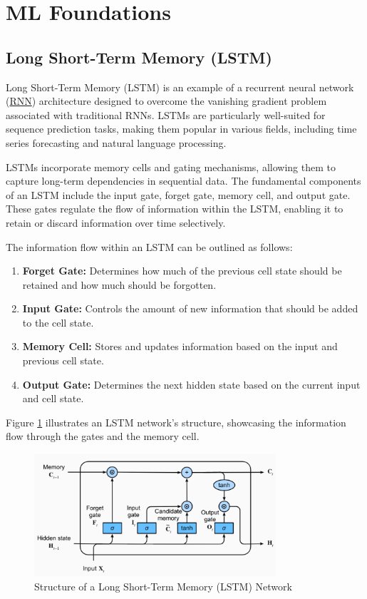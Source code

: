 \documentclass[a4paper,10pt]{article}
\begin{document}
\section{ML Foundations}

\subsection{Long Short-Term Memory (LSTM)}\label{appx:lstm}

Long Short-Term Memory (LSTM) is an example of a recurrent neural network (\hyperref[appx:rnn]{RNN}) architecture designed to overcome the vanishing gradient problem associated with traditional RNNs. LSTMs are particularly well-suited for sequence prediction tasks, making them popular in various fields, including time series forecasting and natural language processing.

LSTMs incorporate memory cells and gating mechanisms, allowing them to capture long-term dependencies in sequential data. The fundamental components of an LSTM include the input gate, forget gate, memory cell, and output gate. These gates regulate the flow of information within the LSTM, enabling it to retain or discard information over time selectively.

The information flow within an LSTM can be outlined as follows:

\begin{enumerate}
  \item \textbf{Forget Gate:} Determines how much of the previous cell state should be retained and how much should be forgotten.

  \item \textbf{Input Gate:} Controls the amount of new information that should be added to the cell state.

  \item \textbf{Memory Cell:} Stores and updates information based on the input and previous cell state.

  \item \textbf{Output Gate:} Determines the next hidden state based on the current input and cell state.

\end{enumerate}

Figure \ref{fig:lstm_structure} illustrates an LSTM network's structure, showcasing the information flow through the gates and the memory cell.

\begin{figure}[ht]
  \centering
  \includegraphics[width=0.8\textwidth]{fig/lstm.png}
  \caption{Structure of a Long Short-Term Memory (LSTM) Network}
  \label{fig:lstm_structure}
\end{figure}
\end{document}
